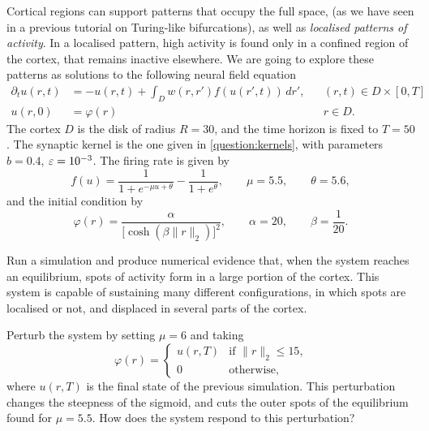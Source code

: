 \documentclass[a4paper]{siamonline220329}
\theoremstyle{plain}
\renewcommand\phi\varphi
\begin{document}
\begin{question}\label{question:spots}
  Cortical regions can support patterns that occupy the full space, 
  (as we have seen in a previous tutorial on Turing-like bifurcations), as well as
  \textit{localised patterns of activity}. In a localised pattern, high activity is
  found only in a confined region of the cortex, that remains inactive elsewhere. We
  are going to explore these patterns as solutions to the following neural field
  equation
\begin{equation}
  \begin{aligned}
    \partial_{t} u(r,t) & = -u(r,t) + \int_{D} w(r,r') f(u(r',t))\,d r',
      && (r,t) \in D \times [0,T] \\
    u(r,0) & = \varphi(r)
      && r \in D.
  \end{aligned}
\end{equation}
  The cortex $D$ is the disk of radius $R=30$, and the time horizon is fixed to
  $T=50$. The synaptic kernel is the one given in \cref{question:kernels}, with
  parameters $b =0.4$, $\varepsilon = 10^{-3}$. The firing rate is given by
  \[
    f(u) = \frac{1}{1+e^{-\mu u+\theta}} - \frac{1}{1+e^{\theta}},
    \qquad \mu =5.5, \qquad \theta = 5.6,
  \]
  and the initial condition by 
  \[
    \varphi(r) = \frac{\alpha}{\bigl[\cosh(\beta \| r \|_2)\bigr]^2},
   \qquad \alpha = 20, \qquad \beta = \frac{1}{20}. 
  \]

  Run a simulation and produce numerical evidence that, when the system reaches an
  equilibrium, spots of activity form in a large portion of the cortex. This system
  is capable of sustaining many different configurations, in which spots are
  localised or not, and displaced in several parts  of the cortex.

  Perturb the system by setting $\mu =6$ and taking
  \[
    \phi(r) = 
    \begin{cases}
      u(r,T) & \text{if $\| r \|_2  \leq 15$,} \\
      0      & \text{otherwise,} 
    \end{cases}
  \]
  where $u(r,T)$ is the final state of the previous simulation. This perturbation
  changes the steepness of the sigmoid, and cuts the outer spots of the
  equilibrium found for $\mu = 5.5$. How does the system respond to this perturbation?
\end{question}
\end{document}
